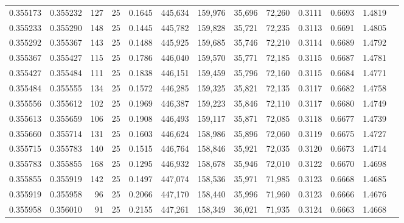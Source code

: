 \begin{tabular}{rrrrrrrrrrrrr}
0.355173 & 0.355232 &   127 &  25 &                                     0.1645 & 445,634 & 159,976 &  35,696 &  72,260 & 0.3111 & 0.6693 & 1.4819 \\
0.355233 & 0.355290 &   148 &  25 &                                     0.1445 & 445,782 & 159,828 &  35,721 &  72,235 & 0.3113 & 0.6691 & 1.4805 \\
0.355292 & 0.355367 &   143 &  25 &                                     0.1488 & 445,925 & 159,685 &  35,746 &  72,210 & 0.3114 & 0.6689 & 1.4792 \\
0.355367 & 0.355427 &   115 &  25 &                                     0.1786 & 446,040 & 159,570 &  35,771 &  72,185 & 0.3115 & 0.6687 & 1.4781 \\
0.355427 & 0.355484 &   111 &  25 &                                     0.1838 & 446,151 & 159,459 &  35,796 &  72,160 & 0.3115 & 0.6684 & 1.4771 \\
0.355484 & 0.355555 &   134 &  25 &                                     0.1572 & 446,285 & 159,325 &  35,821 &  72,135 & 0.3117 & 0.6682 & 1.4758 \\
0.355556 & 0.355612 &   102 &  25 &                                     0.1969 & 446,387 & 159,223 &  35,846 &  72,110 & 0.3117 & 0.6680 & 1.4749 \\
0.355613 & 0.355659 &   106 &  25 &                                     0.1908 & 446,493 & 159,117 &  35,871 &  72,085 & 0.3118 & 0.6677 & 1.4739 \\
0.355660 & 0.355714 &   131 &  25 &                                     0.1603 & 446,624 & 158,986 &  35,896 &  72,060 & 0.3119 & 0.6675 & 1.4727 \\
0.355715 & 0.355783 &   140 &  25 &                                     0.1515 & 446,764 & 158,846 &  35,921 &  72,035 & 0.3120 & 0.6673 & 1.4714 \\
0.355783 & 0.355855 &   168 &  25 &                                     0.1295 & 446,932 & 158,678 &  35,946 &  72,010 & 0.3122 & 0.6670 & 1.4698 \\
0.355855 & 0.355919 &   142 &  25 &                                     0.1497 & 447,074 & 158,536 &  35,971 &  71,985 & 0.3123 & 0.6668 & 1.4685 \\
0.355919 & 0.355958 &    96 &  25 &                                     0.2066 & 447,170 & 158,440 &  35,996 &  71,960 & 0.3123 & 0.6666 & 1.4676 \\
0.355958 & 0.356010 &    91 &  25 &                                     0.2155 & 447,261 & 158,349 &  36,021 &  71,935 & 0.3124 & 0.6663 & 1.4668 \\

\end{tabular}
